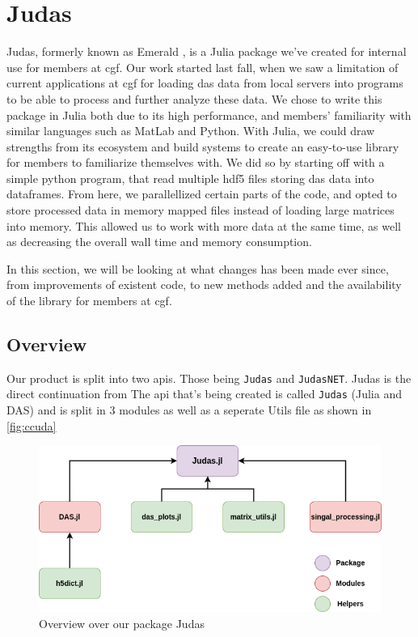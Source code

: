 \section{Judas}

Judas, formerly known as Emerald \cite{projthesis}, is a Julia package we've created for internal use for members at \acrshort{cgf}. Our work started last fall, when we saw a limitation of current applications at \acrshort{cgf} for loading \acrshort{das} data from local servers into programs to be able to process and further analyze these data. We chose to write this package in Julia both due to its high performance, and members' familiarity with similar languages such as MatLab and Python. With Julia, we could draw strengths from its ecosystem and build systems to create an easy-to-use library for members to familiarize themselves with. We did so by starting off with a simple python program, that read multiple \acrshort{hdf5} files storing \acrshort{das} data into dataframes. From here, we parallellized certain parts of the code, and opted to store processed data in memory mapped files instead of loading large matrices into memory. This allowed us to work with more data at the same time, as well as decreasing the overall wall time and memory consumption.  

In this section, we will be looking at what changes has been made ever since, from improvements of existent code, to new methods added and the availability of the library for members at \acrshort{cgf}. \\

\subsection{Overview}

Our product is split into two apis. Those being \texttt{Judas} and \texttt{JudasNET}. Judas is the direct continuation from \cite{projthesis}
The \acrshort{api} that's being created is called \texttt{Judas} (Julia and DAS) and is split in 3 modules as well as a seperate Utils file as shown in \ref{fig:ccuda}

\begin{figure}[h]
    \centering
    \includegraphics[scale=.6]{figures/judas_overview.png}
    \caption{Overview over our package Judas}
    \label{fig:judasoverview}
\end{figure}


